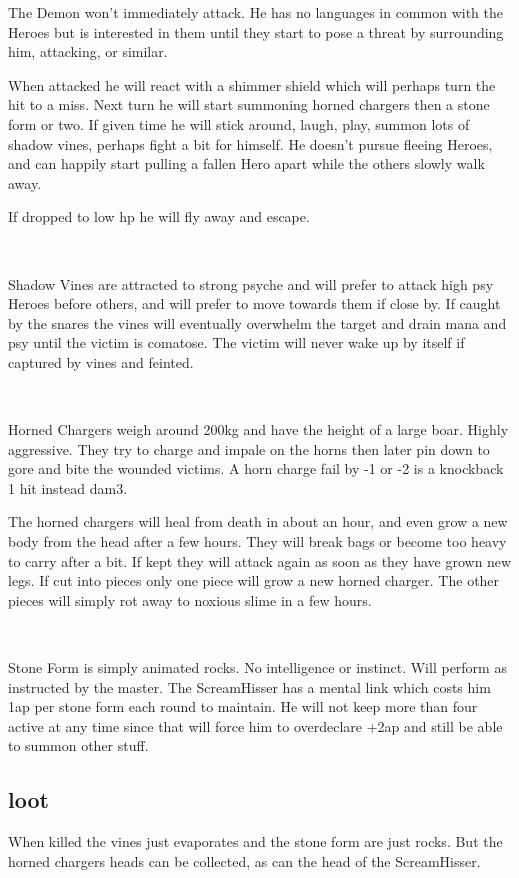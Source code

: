 The Demon won't immediately attack. He has no languages in common with the Heroes but is interested in them until they start to pose a threat by surrounding him, attacking, or similar.

When attacked he will react with a shimmer shield which will perhaps turn the hit to a miss. Next turn he will start summoning horned chargers then a stone form or two. If given time he will stick around, laugh, play, summon lots of shadow vines, perhaps fight a bit for himself. He doesn't pursue fleeing Heroes, and can happily start pulling a fallen Hero apart while the others slowly walk away.

If dropped to low hp he will fly away and escape.

\

Shadow Vines are attracted to strong psyche and will prefer to attack high psy Heroes before others, and will prefer to move towards them if close by. If caught by the snares the vines will eventually overwhelm the target and drain mana and psy until the victim is comatose. The victim will never wake up by itself if captured by vines and feinted.

\

Horned Chargers weigh around 200kg and have the height of a large boar. Highly aggressive. They try to charge and impale on the horns then later pin down to gore and bite the wounded victims. A horn charge fail by -1 or -2 is a knockback 1 hit instead dam3.

The horned chargers will heal from death in about an hour, and even grow a new body from the head after a few hours. They will break bags or become too heavy to carry after a bit. If kept they will attack again as soon as they have grown new legs. If cut into pieces only one piece will grow a new horned charger. The other pieces will simply rot away to noxious slime in a few hours.

\

Stone Form is simply animated rocks. No intelligence or instinct. Will perform as instructed by the master. The ScreamHisser has a mental link which costs him 1ap per stone form each round to maintain. He will not keep more than four active at any time since that will force him to overdeclare +2ap and still be able to summon other stuff.


\subsection*{loot}
When killed the vines just evaporates and the stone form are just rocks. But the horned chargers heads can be collected, as can the head of the ScreamHisser.


